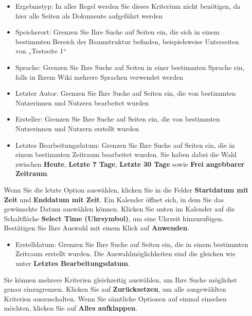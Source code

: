 \documentclass[
  letterpaper,
  DIV=11,
  numbers=noendperiod]{scrreprt}
\providecommand{\tightlist}{%
  \setlength{\itemsep}{0pt}\setlength{\parskip}{0pt}}\usepackage{longtable,booktabs,array}
\begin{document}
\begin{itemize}
\tightlist
\item
  Ergebnistyp: In aller Regel werden Sie dieses Kriterium nicht
  benötigen, da hier alle Seiten als Dokumente aufgeführt werden
\item
  Speicherort: Grenzen Sie Ihre Suche auf Seiten ein, die sich in einem
  bestimmten Bereich der Baumstruktur befinden, beispielsweise
  Unterseiten von „Testseite 1``
\item
  Sprache: Grenzen Sie Ihre Suche auf Seiten in einer bestimmten Sprache
  ein, falls in Ihrem Wiki mehrere Sprachen verwendet werden
\item
  Letzter Autor: Grenzen Sie Ihre Suche auf Seiten ein, die von
  bestimmten Nutzerinnen und Nutzern bearbeitet wurden
\item
  Ersteller: Grenzen Sie Ihre Suche auf Seiten ein, die von bestimmten
  Nutzerinnen und Nutzern erstellt wurden
\item
  Letztes Bearbeitungsdatum: Grenzen Sie Ihre Suche auf Seiten ein, die
  in einem bestimmten Zeitraum bearbeitet wurden. Sie haben dabei die
  Wahl zwischen \textbf{Heute}, \textbf{Letzte 7 Tage}, \textbf{Letzte
  30 Tage} sowie \textbf{Frei angebbarer Zeitraum}.
\end{itemize}

Wenn Sie die letzte Option auswählen, klicken Sie in die Felder
\textbf{Startdatum mit Zeit} und \textbf{Enddatum mit Zeit}. Ein
Kalender öffnet sich, in dem Sie das gewünschte Datum auswählen können.
Klicken Sie unten im Kalender auf die Schaltfläche \textbf{Select Time
(Uhrsymbol)}, um eine Uhrzeit hinzuzufügen. Bestätigen Sie Ihre Auswahl
mit einem Klick auf \textbf{Anwenden}.

\begin{itemize}
\tightlist
\item
  Erstelldatum: Grenzen Sie Ihre Suche auf Seiten ein, die in einem
  bestimmten Zeitraum erstellt wurden. Die Auswahlmöglichkeiten sind die
  gleichen wie unter \textbf{Letztes Bearbeitungsdatum}.
\end{itemize}

Sie können mehrere Kriterien gleichzeitig auswählen, um Ihre Suche
möglichst genau einzugrenzen. Klicken Sie auf \textbf{Zurücksetzen}, um
alle ausgewählten Kriterien auszuschalten. Wenn Sie sämtliche Optionen
auf einmal einsehen möchten, klicken Sie auf \textbf{Alles aufklappen}.
\end{document}
